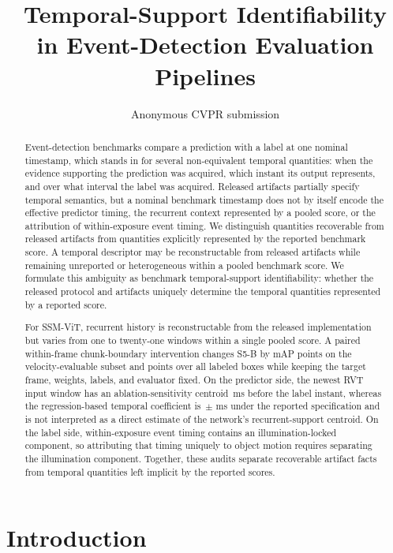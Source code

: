 \documentclass[10pt,twocolumn,letterpaper]{article}
\title{Temporal-Support Identifiability\\
in Event-Detection Evaluation Pipelines}
\author{Anonymous CVPR submission}
\begin{document}
\maketitle

\begin{abstract}
Event-detection benchmarks compare a prediction with a label at one nominal timestamp,
which stands in for several non-equivalent temporal quantities: when the evidence
supporting the prediction was acquired, which instant its output represents, and over what
interval the label was acquired. Released artifacts partially specify temporal semantics,
but a nominal benchmark timestamp does not by itself encode the effective predictor timing,
the recurrent context represented by a pooled score, or the attribution of within-exposure
event timing. We distinguish quantities recoverable from released artifacts from quantities
explicitly represented by the reported benchmark score. A temporal descriptor may be reconstructable
from released artifacts while remaining
unreported or heterogeneous within a pooled benchmark score.
We formulate this ambiguity as benchmark temporal-support identifiability: whether the released
protocol and artifacts uniquely determine the temporal quantities represented by a reported score.

For SSM-ViT, recurrent history is reconstructable from the released implementation but varies
from one to twenty-one windows within a single pooled score. A paired within-frame
chunk-boundary intervention changes S5-B by \ssmPairedMapVelBase{} mAP points on the
velocity-evaluable subset and \ssmPairedMapAllBase{} points over all labeled boxes while
keeping the target frame, weights, labels, and evaluator fixed. On the predictor side, the
newest RVT input window has an ablation-sensitivity centroid \rvtCentroidMagMeas\,ms before
the label instant, whereas the regression-based temporal coefficient is
\ladderFullTau\,$\pm$\,\ladderFullTauSE\,ms under the reported specification and is not
interpreted as a direct estimate of the network's recurrent-support centroid. On the label
side, within-exposure event timing contains an illumination-locked component, so attributing
that timing uniquely to object motion requires separating the illumination component.
Together, these audits separate recoverable artifact facts from temporal quantities left
implicit by the reported scores.
\end{abstract}

\section{Introduction}
\end{document}
